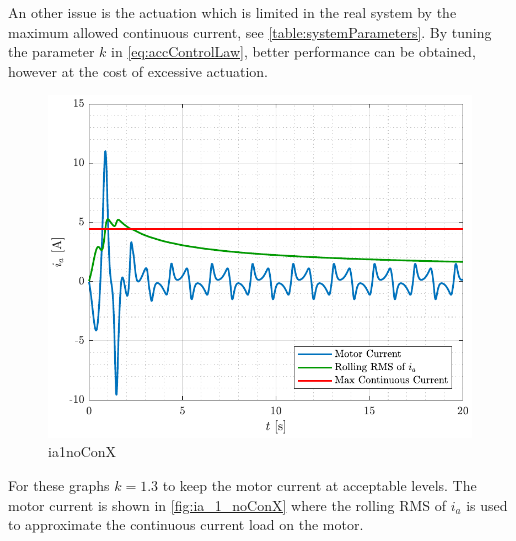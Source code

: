 %
An other issue is the actuation which is limited in the real system by the maximum allowed continuous current, see \autoref{table:systemParameters}. By tuning the parameter $k$ in \autoref{eq:accControlLaw}, better performance can be obtained, however at the cost of excessive actuation.
%
\begin{figure}[H]
  \includegraphics[width=.52\textwidth]{figures/ia_1_noConX}
  \caption{ia1noConX}
  \label{fig:ia_1_noConX}
\end{figure}
%
For these graphs $k=1.3$ to keep the motor current at acceptable levels. The motor current is shown in \autoref{fig:ia_1_noConX} where the rolling RMS of $i_a$ is used to approximate the continuous current load on the motor.



